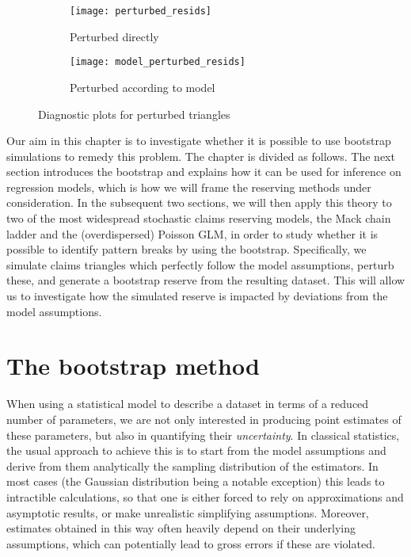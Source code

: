 \documentclass[a4paper]{book}
\begin{document}
\begin{figure}
  \centering
  \begin{subfigure}{\textwidth}
    \texttt{[image: perturbed\_resids]}
    \caption{Perturbed directly}
  \end{subfigure}
  \begin{subfigure}{\textwidth}
    \texttt{[image: model\_perturbed\_resids]}
    \caption{Perturbed according to model}
  \end{subfigure}
  \caption{Diagnostic plots for perturbed triangles}
  \label{fig:diag-plot-perturbed}
\end{figure}

Our aim in this chapter is to investigate whether it is possible to use bootstrap simulations to remedy this problem. The chapter is divided as follows. The next section introduces the bootstrap and explains how it can be used for inference on regression models, which is how we will frame the reserving methods under consideration. In the subsequent two sections, we will then apply this theory to two of the most widespread stochastic claims reserving models, the Mack chain ladder and the (overdispersed) Poisson GLM, in order to study whether it is possible to identify pattern breaks by using the bootstrap. Specifically, we simulate claims triangles which perfectly follow the model assumptions, perturb these, and generate a bootstrap reserve from the resulting dataset. This will allow us to investigate how the simulated reserve is impacted by deviations from the model assumptions.

\section{The bootstrap method} \label{sec:boot}

When using a statistical model to describe a dataset in terms of a reduced number of parameters, we are not only interested in producing point estimates of these parameters, but also in quantifying their \emph{uncertainty}. In classical statistics, the usual approach to achieve this is to start from the model assumptions and derive from them analytically the sampling distribution of the estimators. In most cases (the Gaussian distribution being a notable exception) this leads to intractible calculations, so that one is either forced to rely on approximations and asymptotic results, or make unrealistic simplifying assumptions. Moreover, estimates obtained in this way often heavily depend on their underlying assumptions, which can potentially lead to gross errors if these are violated.
\end{document}
